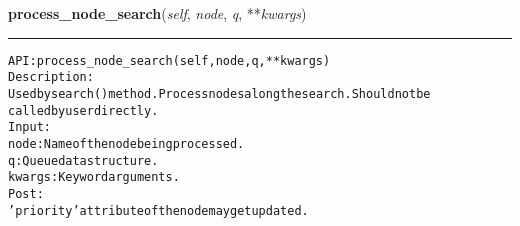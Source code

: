 \hspace{.8\funcindent}\begin{boxedminipage}{\funcwidth}

    \raggedright \textbf{process\_node\_search}(\textit{self}, \textit{node}, \textit{q}, **\textit{kwargs})

    \vspace{-1.5ex}

    \rule{\textwidth}{0.5\fboxrule}
\setlength{\parskip}{2ex}
\begin{alltt}

API: process\_node\_search(self, node, q, **kwargs)
Description:
Used by search() method. Process nodes along the search. Should not be
called by user directly.
Input:
    node: Name of the node being processed.
    q: Queue data structure.
    kwargs: Keyword arguments.
Post:
    'priority' attribute of the node may get updated.
\end{alltt}

\setlength{\parskip}{1ex}
    \end{boxedminipage}

    \label{coinor:gimpy:graph:Graph:random}

    \vspace{0.5ex}

